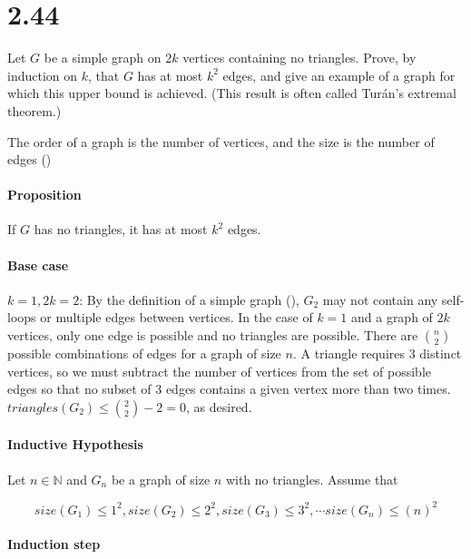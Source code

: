 \documentclass[11pt]{article}
\begin{document}

\section*{2.44}

Let $G$ be a simple graph on $2k$ vertices containing no triangles.
Prove, by induction on $k$, that $G$ has at most $k^2$ edges, and give an example of a graph for which this upper bound is achieved.
(This result is often called Turán’s extremal theorem.)

The order of a graph is the number of vertices, and the size is the number of edges (\cite{chart})

\paragraph{Proposition}

If $G$ has no triangles, it has at most $k^2$ edges.

\paragraph{Base case}

$k=1, 2k=2$: By the definition of a simple graph (\cite{wilson}), $G_2$ may not contain any self-loops or multiple edges between vertices.
In the case of $k=1$ and a graph of $2k$ vertices, only one edge is possible and no triangles are possible.
There are ${n \choose 2}$ possible combinations of edges for a graph of size $n$.
A triangle requires 3 distinct vertices, so we must subtract the number of vertices from the set of possible edges so that no subset of 3 edges contains a given vertex more than two times.
$triangles(G_2) \le {2 \choose 2} - 2 = 0$, as desired.

\paragraph{Inductive Hypothesis}

Let $n \in \mathbb{N}$ and $G_n$ be a graph of size $n$ with no triangles. Assume that

$$size(G_1) \le 1^2, size(G_2) \le 2^2, size(G_3) \le 3^2, \cdots size(G_{n}) \le (n)^2$$

\paragraph{Induction step}
\end{document}

